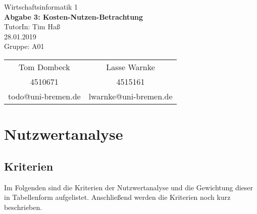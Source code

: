 \documentclass[12pt,utf8]{scrartcl}
\makeatletter
\newcommand{\teilnehmerI}{Tom Dombeck}
\newcommand{\mattI}{4510671}
\newcommand{\mailI}{todo@uni-bremen.de}
\newcommand{\teilnehmerII}{Lasse Warnke}
\newcommand{\mattII}{4515161}
\newcommand{\mailII}{lwarnke@uni-bremen.de}
\newcommand{\thisgroup}{A01}
\newcommand{\abgabedatum}{28.01.2019}
\newcommand{\nummer}{3}
\newcommand{\thema}{Kosten-Nutzen-Betrachtung}
\newcommand{\thistutor}{Tim Haß}
\newcommand{\thiscourse}{Wirtschaftsinformatik 1}
\makeatother
\begin{document}
\setlength{\parindent}{0em}

\begin{titlepage}
	\vspace*{\baselineskip}			%
	\centering						%
	\LARGE							%
	\thiscourse \\ 					%
	\vspace{1cm}					%
	{\Huge 							%
	\textbf{Abgabe \nummer: \thema}} \\ %
	\vspace{1.5cm} 					%
	TutorIn: \thistutor \\ 			%
	\abgabedatum \\ 				%
	\vfill 							%
	Gruppe: \thisgroup \\ 			%
	\vspace{.5cm} 					%
	\large 							%
	\begin{tabular}{c|c} 			%
	\teilnehmerI	& \teilnehmerII \\ %
	\mattI	& \mattII \\ %
	\mailI	& \mailII \\ %
	\end{tabular} 
\end{titlepage}

\thispagestyle{empty}
\tableofcontents

\newpage
\setcounter{page}{1} %

\section*{Nutzwertanalyse}

\subsection*{Kriterien}

Im Folgenden sind die Kriterien der Nutzwertanalyse und die Gewichtung dieser in Tabellenform aufgelistet. Anschließend werden die Kriterien noch kurz beschrieben.
\end{document}
